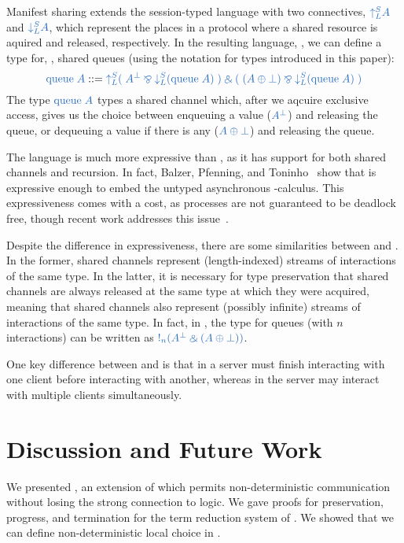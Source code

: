 \documentclass[envcountsame,UKenglish]{llncs}
\begin{document}
Manifest sharing extends the session-typed language \SILL with two connectives, $\ty{\acquire{A}}$ and $\ty{\release{A}}$, which represent the places in a protocol where a shared resource is aquired and released, respectively. In the resulting language, \SILLS, we can define a type for, \eg, shared queues (using the notation for types introduced in this paper):
\[
  \ty{\queue{A}} ::=
  \ty{\acquire{
      (\; A^\bot \parr \release{(\queue{A})} \;)
      \with
      (\; (A \plus \bot) \parr \release{(\queue{A})} \;)
    }}
\]
The type $\ty{\queue{A}}$ types a shared channel which, after we aqcuire exclusive access, gives us the choice between enqueuing a value ($\ty{A^\bot}$) and releasing the queue, or dequeuing a value if there is any ($\ty{A \plus \bot}$) and releasing the queue.

The language \SILLS is much more expressive than \nodcap, as it has support for both shared channels and recursion.
In fact, Balzer, Pfenning, and Toninho~\cite{balzer2018} show that \SILLS is expressive enough to embed the untyped asynchronous \textpi-calculus. This expressiveness comes with a cost, as \SILLS processes are not guaranteed to be deadlock free, though recent work addresses this issue~\cite{balzer2019}.

Despite the difference in expressiveness, there are some similarities between \nodcap and \SILLS. In the former, shared channels represent (length-indexed) streams of interactions of the same type. In the latter, it is necessary for type preservation that shared channels are always released at the same type at which they were acquired, meaning that shared channels also represent (possibly infinite) streams of interactions of the same type. In fact, in \nodcap, the type for queues (with $n$ interactions) can be written as $\ty{\take[n]{(A^\bot \with (A \plus \bot))}}$.

One key difference between \nodcap and \SILLS is that in \SILLS a server must
finish interacting with one client before interacting with another, whereas in
\nodcap the server may interact with multiple clients simultaneously.

\section{Discussion and Future Work}\label{sec:conclusion}
We presented \nodcap, an extension of \hcp which permits non-deterministic communication without losing the strong connection to logic.
We gave proofs for preservation, progress, and termination for the term reduction system of \nodcap.
We showed that we can define non-deterministic local choice in \nodcap.
\end{document}
